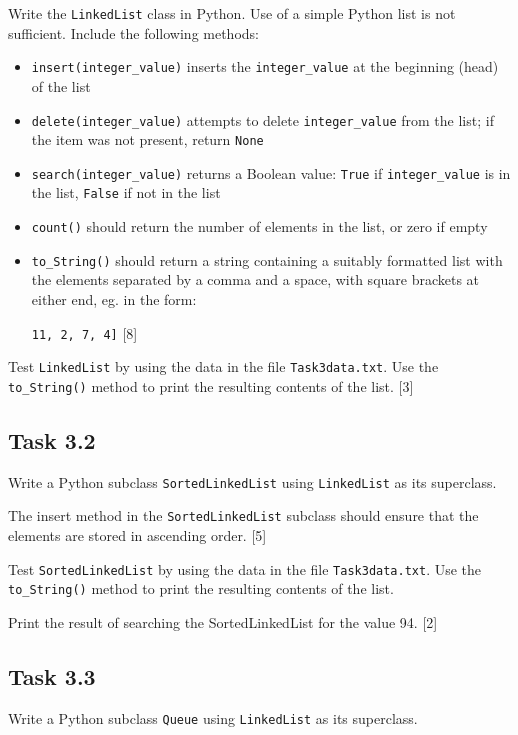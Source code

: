Write the \texttt{LinkedList} class in Python. Use of a simple Python
list is not sufficient. Include the following methods: 
\begin{itemize}
\item \texttt{insert(integer\_value)} inserts the \texttt{integer\_value}
at the beginning (head) of the list 
\item \texttt{delete(integer\_value)} attempts to delete \texttt{integer\_value}
from the list; if the item was not present, return \texttt{None} 
\item \texttt{search(integer\_value)} returns a Boolean value: \texttt{True}
if \texttt{integer\_value} is in the list, \texttt{False} if not in
the list 
\item \texttt{count()} should return the number of elements in the list,
or zero if empty 
\item \texttt{to\_String()} should return a string containing a suitably
formatted list with the elements separated by a comma and a space,
with square brackets at either end, eg. in the form: 

\texttt{\qquad{}{[}11, 2, 7, 4{]}} \hfill{}{[}8{]}
\end{itemize}
Test \texttt{LinkedList} by using the data in the file \texttt{Task3data.txt}.
Use the \texttt{to\_String()} method to print the resulting contents
of the list. \hfill{}{[}3{]}

\subsection*{Task 3.2 }

Write a Python subclass \texttt{SortedLinkedList} using \texttt{LinkedList}
as its superclass. 

The insert method in the \texttt{SortedLinkedList} subclass should
ensure that the elements are stored in ascending order. \hfill{}{[}5{]}

Test \texttt{SortedLinkedList} by using the data in the file \texttt{Task3data.txt}.
Use the \texttt{to\_String()} method to print the resulting contents
of the list. 

Print the result of searching the SortedLinkedList for the value 94.
\hfill{}{[}2{]}

\subsection*{Task 3.3 }

Write a Python subclass \texttt{Queue} using \texttt{LinkedList} as
its superclass.

